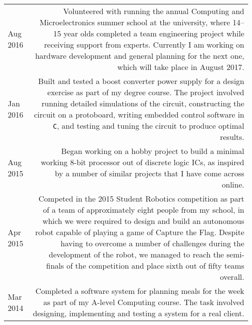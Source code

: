 
\vspace{-1.2em}

\begin{longtable}{L!{\sep}R}
    Aug 2016 &
    Volunteered with running the annual Computing and Microelectronics summer school at the university, where 14--15 year olds completed a team engineering project while receiving support from experts. Currently I am working on hardware development and general planning for the next one, which will take place in August 2017.
    \vspace{1.2em} \\


    Jan 2016 &
    Built and tested a boost converter power supply for a design exercise as part of my degree course. The project involved running detailed simulations of the circuit, constructing the circuit on a protoboard, writing embedded control software in \texttt{C}, and testing and tuning the circuit to produce optimal results.
    \vspace{1.2em} \\

    Aug 2015 &
    Began working on a hobby project to build a minimal working 8-bit processor out of discrete logic ICs, as inspired by a number of similar projects that I have come across online.
    \vspace{1.2em} \\

    Apr 2015 &
    Competed in the 2015 Student Robotics competition as part of a team of approximately eight people from my school, in which we were required to design and build an autonomous robot capable of playing a game of Capture the Flag. Despite having to overcome a number of challenges during the development of the robot, we managed to reach the semi-finals of the competition and place sixth out of fifty teams overall.
    \vspace{1.2em} \\

    Mar 2014 &
    Completed a software system for planning meals for the week as part of my A-level Computing course. The task involved designing, implementing and testing a system for a real client.
    \vspace{1.2em} \\


\end{longtable}
